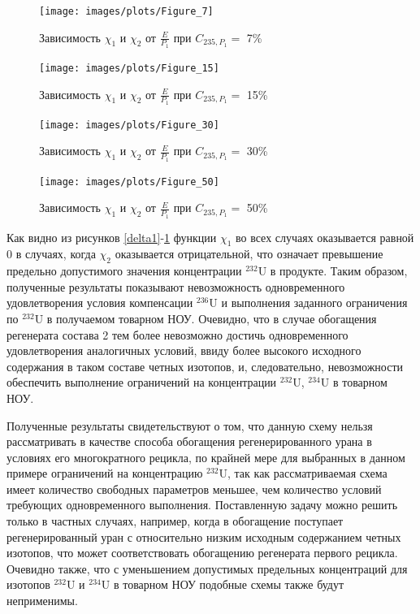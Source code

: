 \begin{figure}[ht]
  \begin{minipage}{.5\textwidth}
    \centering
    \texttt{[image: images/plots/Figure\_7]}  
    \caption{Зависимость $\chi_1$ и $\chi_2$ от $\frac{E}{P_1}$ при $C_{235, P_1}=$ 7\%}
    \label{delta1}
  \end{minipage}
  \begin{minipage}{.5\textwidth}
    \centering
    \texttt{[image: images/plots/Figure\_15]}  
    \caption{Зависимость $\chi_1$ и $\chi_2$ от $\frac{E}{P_1}$ при $C_{235, P_1}=$ 15\%}
    \label{delta2}
  \end{minipage}
  \begin{minipage}{.5\textwidth}
    \centering
    \texttt{[image: images/plots/Figure\_30]}  
    \caption{Зависимость $\chi_1$ и $\chi_2$ от $\frac{E}{P_1}$ при $C_{235, P_1}=$ 30\%}
    \label{delta3}
  \end{minipage}
  \begin{minipage}{.5\textwidth}
    \centering
    \texttt{[image: images/plots/Figure\_50]}  
    \caption{Зависимость $\chi_1$ и $\chi_2$ от $\frac{E}{P_1}$ при $C_{235, P_1}=$ 50\%}
    \label{delta4}
  \end{minipage}
 \end{figure}

Как видно из рисунков \ref{delta1}-\ref{delta4} функции $\chi_1$ во всех случаях оказывается равной 0 в случаях, когда $\chi_2$ оказывается отрицательной, что означает превышение предельно допустимого значения концентрации $^{232}$U в продукте. Таким образом, полученные результаты показывают невозможность одновременного удовлетворения условия компенсации $^{236}$U и выполнения заданного ограничения по $^{232}$U в получаемом товарном НОУ. Очевидно, что в случае обогащения регенерата состава 2 тем более невозможно достичь одновременного удовлетворения аналогичных условий, ввиду более высокого исходного содержания в таком составе четных изотопов, и, следовательно, невозможности обеспечить выполнение ограничений на концентрации $^{232}$U, $^{234}$U в товарном НОУ. 

Полученные результаты свидетельствуют о том, что данную схему нельзя рассматривать в качестве способа обогащения регенерированного урана в условиях его многократного рецикла, по крайней мере для выбранных в данном примере ограничений на концентрацию $^{232}$U, так как рассматриваемая схема имеет количество свободных параметров меньшее, чем количество условий требующих одновременного выполнения. Поставленную задачу можно решить только в частных случаях, например, когда в обогащение поступает регенерированный уран с относительно низким исходным содержанием четных изотопов, что может соответствовать обогащению регенерата первого рецикла. Очевидно также, что с уменьшением допустимых предельных концентраций для изотопов $^{232}$U и $^{234}$U в товарном НОУ подобные схемы также будут неприменимы.

